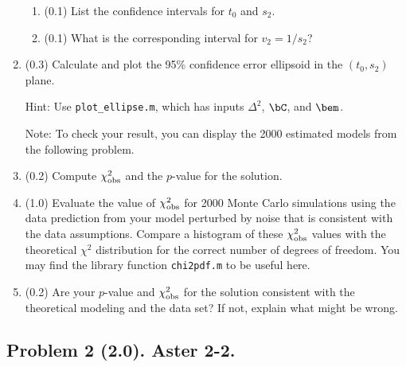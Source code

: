 \documentclass[11pt,titlepage,fleqn]{article}
\begin{document}
\begin{enumerate}
\begin{enumerate}
\item (0.1) List the confidence intervals for $t_0$ and $s_2$.
\item (0.1) What is the corresponding interval for $v_2 = 1/s_2$?
\end{enumerate}

\item (0.3) Calculate and plot the 95\% confidence error ellipsoid in the $(t_0, s_2)$ plane.

Hint: Use \verb+plot_ellipse.m+, which has inputs $\Delta^2$, $\bC$, and $\bem$.

Note: To check your result, you can display the 2000 estimated models from the following problem.

\item (0.2) Compute $\chi^2_{\rm obs}$ and the $p$-value for the solution.

\item (1.0) Evaluate the value of $\chi^2_{\rm obs}$ for 2000 Monte Carlo simulations using the data prediction from your model perturbed by noise that is consistent with the data assumptions. Compare a histogram of these $\chi^2_{\rm obs}$ values with the theoretical $\chi^2$ distribution for the correct number of degrees of freedom.
You may find the library function \verb+chi2pdf.m+ to be useful here.

\label{monte}

\item (0.2) Are your $p$-value and $\chi^2_{\rm obs}$ for the solution consistent with the theoretical modeling and the data set? If not, explain what might be wrong.

\end{enumerate}


\subsection*{Problem 2 (2.0). Aster 2-2.}
\end{document}

